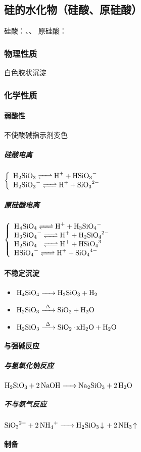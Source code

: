 \documentclass[a4paper]{article}
\begin{document}
	
	\subsection{硅的水化物（硅酸、原硅酸）}
	硅酸：、、
	原硅酸：
	\subsubsection{物理性质}
	白色胶状沉淀
	\subsubsection{化学性质}
	\paragraph{弱酸性}
	不使酸碱指示剂变色
	\subparagraph{硅酸电离}
	$\left\{\begin{array}{lr}
		\ce{H2SiO3 <=> H+ + HSiO3-}\\
		\ce{H2SiO3- <=> H+ + SiO3^2-}\\
	\end{array}\right.$
	\subparagraph{原硅酸电离}
	$\left\{\begin{array}{lr}
		\ce{H4SiO4 <=> H+ + H3SiO4-}\\
		\ce{H3SiO4- <=> H+ + H2SiO4^2-}\\
		\ce{H2SiO4- <=> H+ + HSiO4^3-}\\
		\ce{HSiO4- <=> H+ + SiO4^4-}\\
	\end{array}\right.$
	\paragraph{不稳定沉淀}
	\begin{itemize}
		\item $\ce{H4SiO4 -> H2SiO3 + H2}$
		\item $\ce{H2SiO3 ->[\Delta] SiO2 + H2O}$
		\item $\ce{H2SiO3 ->[\Delta] SiO2*xH2O + H2O}$
	\end{itemize}
	\paragraph{与强碱反应}
	\subparagraph{与氢氧化钠反应}
	$\ce{H2SiO3 + 2NaOH -> Na2SiO3 + 2H2O}$
	\subparagraph{不与氨气反应}
	$\ce{SiO3^2- + 2NH4+ -> H2SiO3 v + 2NH3 ^}$
	\paragraph{制备}
	
\end{document}
